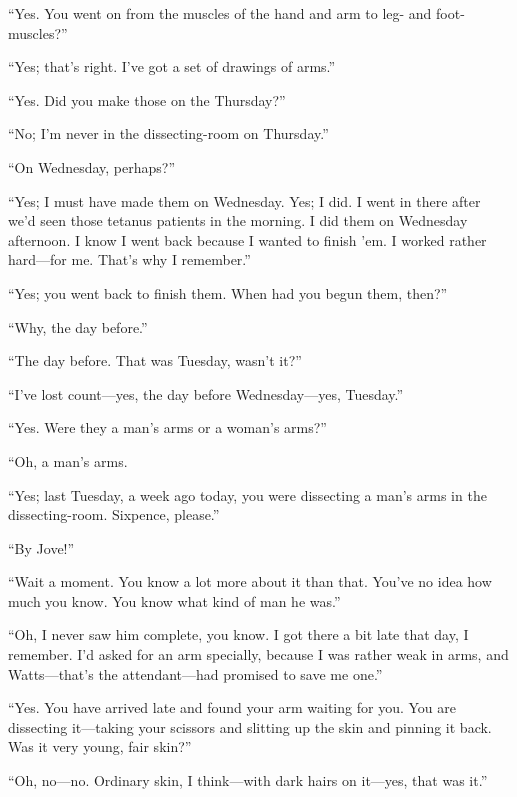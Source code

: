 \enquote{Yes. You went on from the muscles of the hand and arm to leg- and foot-muscles?}

\enquote{Yes; that’s right. I’ve got a set of drawings of arms.}

\enquote{Yes. Did you make those on the Thursday?}

\enquote{No; I’m never in the dissecting-room on Thursday.}

\enquote{On Wednesday, perhaps?}

\enquote{Yes; I must have made them on Wednesday. Yes; I did. I went in there after we’d seen those tetanus patients in the morning. I did them on Wednesday afternoon. I know I went back because I wanted to finish ’em. I worked rather hard\allowbreak---\allowbreak for me. That’s why I remember.}

\enquote{Yes; you went back to finish them. When had you begun them, then?}

\enquote{Why, the day before.}

\enquote{The day before. That was Tuesday, wasn’t it?}

\enquote{I’ve lost count\allowbreak---\allowbreak yes, the day before Wednesday\allowbreak---\allowbreak yes, Tuesday.}

\enquote{Yes. Were they a man’s arms or a woman’s arms?}

“Oh, a man’s arms.

\enquote{Yes; last Tuesday, a week ago today, you were dissecting a man’s arms in the dissecting-room. Sixpence, please.}

\enquote{By Jove!}

\enquote{Wait a moment. You know a lot more about it than that. You’ve no idea how much you know. You know what kind of man he was.}

\enquote{Oh, I never saw him complete, you know. I got there a bit late that day, I remember. I’d asked for an arm specially, because I was rather weak in arms, and Watts\allowbreak---\allowbreak that’s the attendant\allowbreak---\allowbreak had promised to save me one.}

\enquote{Yes. You have arrived late and found your arm waiting for you. You are dissecting it\allowbreak---\allowbreak taking your scissors and slitting up the skin and pinning it back. Was it very young, fair skin?}

\enquote{Oh, no\allowbreak---\allowbreak no. Ordinary skin, I think\allowbreak---\allowbreak with dark hairs on it\allowbreak---\allowbreak yes, that was it.}

